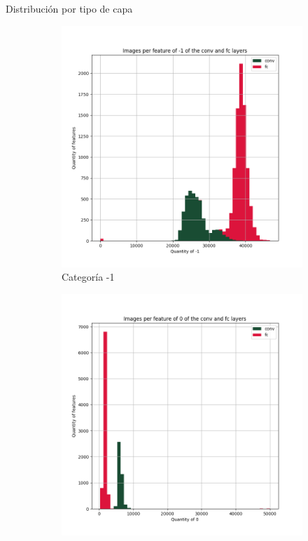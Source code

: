 \documentclass{beamer}
\begin{document}
\begin{frame}{Distribución por tipo de capa}

\begin{figure}[ht] 
	\centering
	\begin{subfigure}[b]{0.32\textwidth}
		\includegraphics[width=\textwidth] {Images/plots/25/Images_per_feature_of_-1_category_all_layers.png}
		\caption{Categoría -1}
	\end{subfigure}
	\begin{subfigure}[b]{0.32\textwidth}
		\includegraphics[width=\textwidth]  {Images/plots/25/Images_per_feature_of_0_category_all_layers.png}

\end{subfigure}
\end{figure}
\end{frame}
\end{document}
